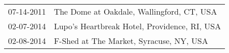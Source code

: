 \begin{supertabular}{ll}
 07-14-2011 &     The Dome at Oakdale, Wallingford, CT, USA \\
 02-07-2014 &  Lupo's Heartbreak Hotel, Providence, RI, USA \\
 02-08-2014 &       F-Shed at The Market, Syracuse, NY, USA \\
\end{supertabular}
